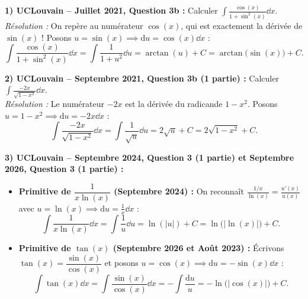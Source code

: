 \begin{exemple}
\textbf{1) UCLouvain -- Juillet 2021, Question 3b :} Calculer $\displaystyle\int \frac{\cos(x)}{1 + \sin^2(x)}\dd x$.\\
\emph{Résolution :} On repère au numérateur $\cos(x)$, qui est exactement la dérivée de $\sin(x)$ ! Posons $u = \sin(x) \implies \mathrm{d}u = \cos(x)\dd x$ :
\[
    \int \frac{\cos(x)}{1 + \sin^2(x)}\dd x = \int \frac{1}{1 + u^2}\dd u = \arctan(u) + C = \boxed{\arctan\bigl(\sin(x)\bigr) + C}.
\]

\medskip
\textbf{2) UCLouvain -- Septembre 2021, Question 3b (1\iere{} partie) :} Calculer $\displaystyle\int \frac{-2x}{\sqrt{1 - x^2}}\dd x$.\\
\emph{Résolution :} Le numérateur $-2x$ est la dérivée du radicande $1 - x^2$. Posons $u = 1 - x^2 \implies \mathrm{d}u = -2x\dd x$ :
\[
    \int \frac{-2x}{\sqrt{1 - x^2}}\dd x = \int \frac{1}{\sqrt{u}}\dd u = 2\sqrt{u} + C = \boxed{2\sqrt{1 - x^2} + C}.
\]

\medskip
\textbf{3) UCLouvain -- Septembre 2024, Question 3 (1\iere{} partie) et Septembre 2026, Question 3 (1\iere{} partie) :}
\begin{itemize}
    \item \textbf{Primitive de $\dfrac{1}{x\ln(x)}$ (Septembre 2024) :} On reconnaît $\frac{1/x}{\ln(x)} = \frac{u'(x)}{u(x)}$ avec $u = \ln(x) \implies \mathrm{d}u = \frac{1}{x}\dd x$ :
    \[
        \int \frac{1}{x\ln(x)}\dd x = \int \frac{1}{u}\dd u = \ln(|u|) + C = \boxed{\ln\bigl(|\ln(x)|\bigr) + C}.
    \]
    \item \textbf{Primitive de $\tan(x)$ (Septembre 2026 et Août 2023) :} Écrivons $\tan(x) = \dfrac{\sin(x)}{\cos(x)}$ et posons $u = \cos(x) \implies \mathrm{d}u = -\sin(x)\dd x$ :
    \[
        \int \tan(x)\dd x = \int \frac{\sin(x)}{\cos(x)}\dd x = -\int \frac{\mathrm{d}u}{u} = \boxed{-\ln\bigl(|\cos(x)|\bigr) + C}.
    \]
\end{itemize}


\end{exemple}
